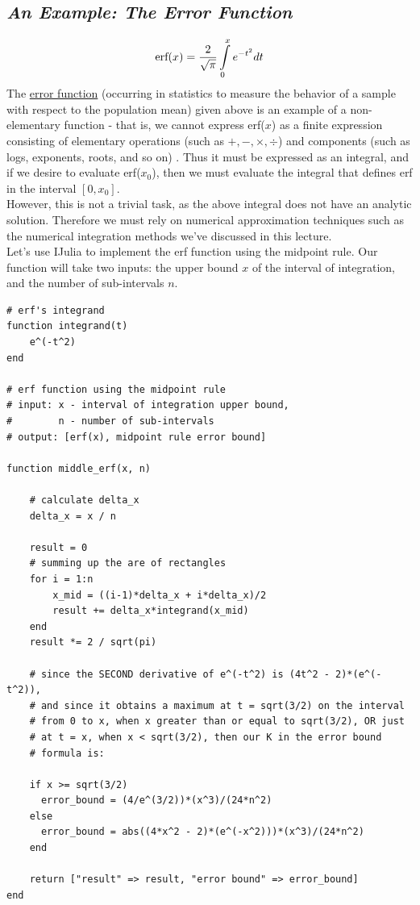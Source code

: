 \documentclass[11pt,a4paper,oneside]{report}
\begin{document}
{\center\color{magenta}
\subsection*{\it\huge An Example: The Error Function}}

\[\textnormal{erf}(x) = \frac{2}{\sqrt{\pi}}\int\limits_0^xe^{-t^2}dt\]
The \href{http://en.wikipedia.org/wiki/Error_function}{error function} (occurring in statistics to measure the behavior of a sample with respect to the population mean) given above is an example of a non-elementary function - that is, we cannot express erf($x$) as a finite expression consisting of elementary operations (such as $+,-,\times,\div$) and components (such as logs, exponents, roots, and so on) . Thus it must be expressed as an integral, and if we desire to evaluate erf($x_0$), then we must evaluate the integral that defines erf in the interval $[0,x_0]$.\\

However, this is not a trivial task, as the above integral does not have an analytic solution. Therefore we must rely on numerical approximation techniques such as the numerical integration methods we've discussed in this lecture.\\

Let's use IJulia to implement the erf function using the midpoint rule. Our function will take two inputs: the upper bound $x$ of the interval of integration, and the number of sub-intervals $n$.\\
\newpage
\begin{verbatim}
# erf's integrand
function integrand(t)
    e^(-t^2)
end    

# erf function using the midpoint rule
# input: x - interval of integration upper bound, 
#        n - number of sub-intervals
# output: [erf(x), midpoint rule error bound]

function middle_erf(x, n)
    
    # calculate delta_x
    delta_x = x / n
   
    result = 0
    # summing up the are of rectangles
    for i = 1:n
        x_mid = ((i-1)*delta_x + i*delta_x)/2
        result += delta_x*integrand(x_mid)
    end
    result *= 2 / sqrt(pi)
    
    # since the SECOND derivative of e^(-t^2) is (4t^2 - 2)*(e^(-t^2)),
    # and since it obtains a maximum at t = sqrt(3/2) on the interval 
    # from 0 to x, when x greater than or equal to sqrt(3/2), OR just 
    # at t = x, when x < sqrt(3/2), then our K in the error bound
    # formula is:
    
    if x >= sqrt(3/2)
      error_bound = (4/e^(3/2))*(x^3)/(24*n^2)
    else 
      error_bound = abs((4*x^2 - 2)*(e^(-x^2)))*(x^3)/(24*n^2)
    end    
    
    return ["result" => result, "error bound" => error_bound]
end
\end{verbatim}
\newpage
\end{document}
